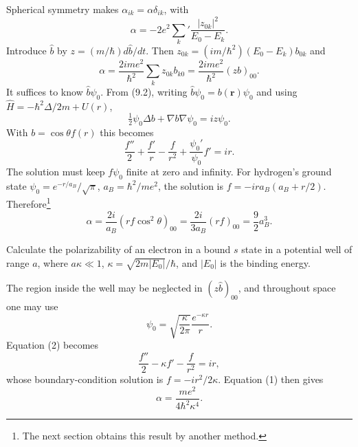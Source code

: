 \SolutionHeading Spherical symmetry makes $\alpha_{ik}=\alpha\delta_{ik}$, with
\[\alpha=-2e^2\sum_k'\frac{|z_{0k}|^2}{E_0-E_k}.\]
Introduce $\widehat b$ by $z=(m/\hbar)d\widehat b/dt$. Then $z_{0k}=(im/\hbar^2)(E_0-E_k)b_{0k}$ and
\begin{equation}\alpha=\frac{2ime^2}{\hbar^2}\sum_kz_{0k}b_{k0}=\frac{2ime^2}{\hbar^2}(zb)_{00}.\tag{1}\end{equation}
It suffices to know $\widehat b\psi_0$. From (9.2), writing $\widehat b\psi_0=b(\mathbf r)\psi_0$ and using $\widehat H=-\hbar^2\Delta/2m+U(r)$,
\[\tfrac12\psi_0\Delta b+\nabla b\nabla\psi_0=iz\psi_0.\]
With $b=\cos\theta f(r)$ this becomes
\begin{equation}\frac{f''}{2}+\frac{f'}r-\frac f{r^2}+\frac{\psi_0'}{\psi_0}f'=ir.\tag{2}\end{equation}
The solution must keep $f\psi_0$ finite at zero and infinity. For hydrogen's ground state $\psi_0=e^{-r/a_B}/\sqrt\pi$, $a_B=\hbar^2/me^2$, the solution is $f=-ira_B(a_B+r/2)$. Therefore\footnote{The next section obtains this result by another method.}
\[\alpha=\frac{2i}{a_B}(rf\cos^2\theta)_{00}=\frac{2i}{3a_B}(rf)_{00}=\frac92a_B^3.\]

 Calculate the polarizability of an electron in a bound $s$ state in a potential well of range $a$, where $a\kappa\ll1$, $\kappa=\sqrt{2m|E_0|}/\hbar$, and $|E_0|$ is the binding energy.

\SolutionHeading The region inside the well may be neglected in $(z\widehat b)_{00}$, and throughout space one may use
\[\psi_0=\sqrt{\frac{\kappa}{2\pi}}\frac{e^{-\kappa r}}r.\]
Equation (2) becomes
\[\frac{f''}{2}-\kappa f'-\frac f{r^2}=ir,\]
whose boundary-condition solution is $f=-ir^2/2\kappa$. Equation (1) then gives
\[\alpha=\frac{me^2}{4\hbar^2\kappa^4}.\]
